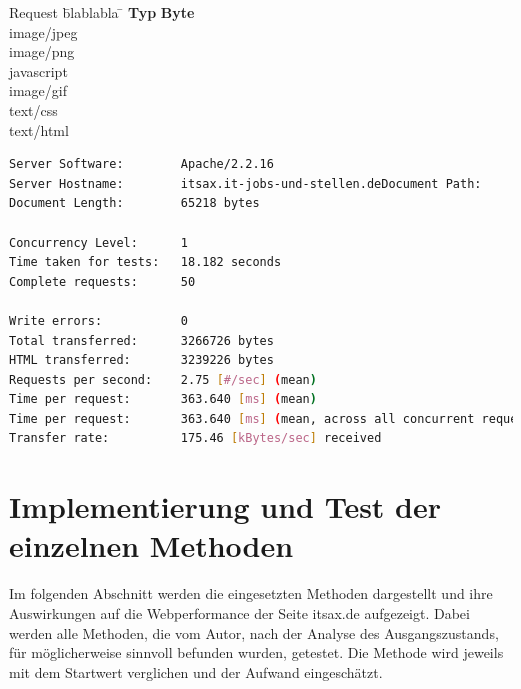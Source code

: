 \begin{tabbing}
Request \quad\= blablabla \quad\= \kill
\textbf{Typ} 	 \> \textbf{Byte} \\
image/jpeg	\\
image/png	\\
javascript	\\
image/gif	\\
text/css	\\
text/html	\\

\end{tabbing}
\begin{lstlisting}[language=bash,label=Ausgabe von ab,caption=Ausgabe von ab]
Server Software:        Apache/2.2.16
Server Hostname:        itsax.it-jobs-und-stellen.deDocument Path:          /
Document Length:        65218 bytes

Concurrency Level:      1
Time taken for tests:   18.182 seconds
Complete requests:      50

Write errors:           0
Total transferred:      3266726 bytes
HTML transferred:       3239226 bytes
Requests per second:    2.75 [#/sec] (mean)
Time per request:       363.640 [ms] (mean)
Time per request:       363.640 [ms] (mean, across all concurrent requests)
Transfer rate:          175.46 [kBytes/sec] received
\end{lstlisting}




\section{Implementierung und Test der einzelnen Methoden}
Im folgenden Abschnitt werden die eingesetzten Methoden dargestellt und ihre Auswirkungen auf die Webperformance der Seite itsax.de aufgezeigt. 
Dabei werden alle Methoden, die vom Autor, nach der Analyse des Ausgangszustands, für möglicherweise sinnvoll befunden wurden, getestet. Die Methode wird jeweils mit dem Startwert verglichen und der Aufwand eingeschätzt.
